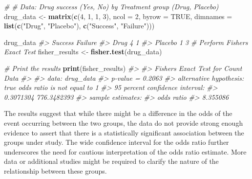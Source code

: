 \documentclass[
]{book}
\newenvironment{Shaded}{\begin{snugshade}}{\end{snugshade}}
\newcommand{\AttributeTok}[1]{\textcolor[rgb]{0.13,0.29,0.53}{#1}}
\newcommand{\CommentTok}[1]{\textcolor[rgb]{0.56,0.35,0.01}{\textit{#1}}}
\newcommand{\ConstantTok}[1]{\textcolor[rgb]{0.56,0.35,0.01}{#1}}
\newcommand{\DecValTok}[1]{\textcolor[rgb]{0.00,0.00,0.81}{#1}}
\newcommand{\FunctionTok}[1]{\textcolor[rgb]{0.13,0.29,0.53}{\textbf{#1}}}
\newcommand{\NormalTok}[1]{#1}
\newcommand{\OtherTok}[1]{\textcolor[rgb]{0.56,0.35,0.01}{#1}}
\newcommand{\StringTok}[1]{\textcolor[rgb]{0.31,0.60,0.02}{#1}}
\begin{document}
\begin{Shaded}
\begin{Highlighting}[]
\CommentTok{\# }
\CommentTok{\# Data: Drug success (Yes, No) by Treatment group (Drug, Placebo)}
\NormalTok{drug\_data }\OtherTok{\textless{}{-}} \FunctionTok{matrix}\NormalTok{(}\FunctionTok{c}\NormalTok{(}\DecValTok{4}\NormalTok{, }\DecValTok{1}\NormalTok{, }\DecValTok{1}\NormalTok{, }\DecValTok{3}\NormalTok{), }\AttributeTok{ncol =} \DecValTok{2}\NormalTok{, }\AttributeTok{byrow =} \ConstantTok{TRUE}\NormalTok{,}
                    \AttributeTok{dimnames =} \FunctionTok{list}\NormalTok{(}\FunctionTok{c}\NormalTok{(}\StringTok{"Drug"}\NormalTok{, }\StringTok{"Placebo"}\NormalTok{),}
                                    \FunctionTok{c}\NormalTok{(}\StringTok{"Success"}\NormalTok{, }\StringTok{"Failure"}\NormalTok{)))}

\NormalTok{drug\_data}
\CommentTok{\#\textgreater{}         Success Failure}
\CommentTok{\#\textgreater{} Drug          4       1}
\CommentTok{\#\textgreater{} Placebo       1       3}
\CommentTok{\# Perform Fisher\textquotesingle{}s Exact Test}
\NormalTok{fisher\_results }\OtherTok{\textless{}{-}} \FunctionTok{fisher.test}\NormalTok{(drug\_data)}

\CommentTok{\# Print the results}
\FunctionTok{print}\NormalTok{(fisher\_results)}
\CommentTok{\#\textgreater{} }
\CommentTok{\#\textgreater{}  Fisher\textquotesingle{}s Exact Test for Count Data}
\CommentTok{\#\textgreater{} }
\CommentTok{\#\textgreater{} data:  drug\_data}
\CommentTok{\#\textgreater{} p{-}value = 0.2063}
\CommentTok{\#\textgreater{} alternative hypothesis: true odds ratio is not equal to 1}
\CommentTok{\#\textgreater{} 95 percent confidence interval:}
\CommentTok{\#\textgreater{}    0.3071304 776.3482393}
\CommentTok{\#\textgreater{} sample estimates:}
\CommentTok{\#\textgreater{} odds ratio }
\CommentTok{\#\textgreater{}   8.355086}
\end{Highlighting}
\end{Shaded}

The results suggest that while there might be a difference in the odds of the event occurring between the two groups, the data do not provide strong enough evidence to assert that there is a statistically significant association between the groups under study. The wide confidence interval for the odds ratio further underscores the need for cautious interpretation of the odds ratio estimate. More data or additional studies might be required to clarify the nature of the relationship between these groups.
\end{document}
